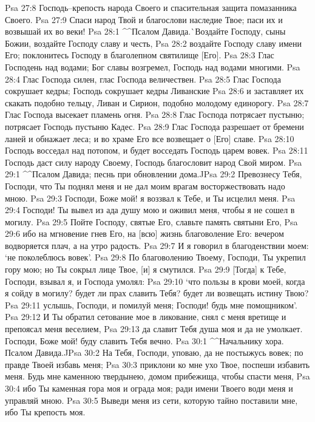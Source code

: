 Psa 27:8  Господь--крепость народа Своего и спасительная защита помазанника Своего.
Psa 27:9  Спаси народ Твой и благослови наследие Твое; паси их и возвышай их во веки!
Psa 28:1  ^^Псалом Давида.^^ Воздайте Господу, сыны Божии, воздайте Господу славу и честь,
Psa 28:2  воздайте Господу славу имени Его; поклонитесь Господу в благолепном святилище [Его].
Psa 28:3  Глас Господень над водами; Бог славы возгремел, Господь над водами многими.
Psa 28:4  Глас Господа силен, глас Господа величествен.
Psa 28:5  Глас Господа сокрушает кедры; Господь сокрушает кедры Ливанские
Psa 28:6  и заставляет их скакать подобно тельцу, Ливан и Сирион, подобно молодому единорогу.
Psa 28:7  Глас Господа высекает пламень огня.
Psa 28:8  Глас Господа потрясает пустыню; потрясает Господь пустыню Кадес.
Psa 28:9  Глас Господа разрешает от бремени ланей и обнажает леса; и во храме Его все возвещает о [Его] славе.
Psa 28:10  Господь восседал над потопом, и будет восседать Господь царем вовек.
Psa 28:11  Господь даст силу народу Своему, Господь благословит народ Свой миром.
Psa 29:1  ^^Псалом Давида; песнь при обновлении дома.^^
Psa 29:2  Превознесу Тебя, Господи, что Ты поднял меня и не дал моим врагам восторжествовать надо мною.
Psa 29:3  Господи, Боже мой! я воззвал к Тебе, и Ты исцелил меня.
Psa 29:4  Господи! Ты вывел из ада душу мою и оживил меня, чтобы я не сошел в могилу.
Psa 29:5  Пойте Господу, святые Его, славьте память святыни Его,
Psa 29:6  ибо на мгновение гнев Его, на [всю] жизнь благоволение Его: вечером водворяется плач, а на утро радость.
Psa 29:7  И я говорил в благоденствии моем: `не поколеблюсь вовек'.
Psa 29:8  По благоволению Твоему, Господи, Ты укрепил гору мою; но Ты сокрыл лице Твое, [и] я смутился.
Psa 29:9  [Тогда] к Тебе, Господи, взывал я, и Господа умолял:
Psa 29:10  `что пользы в крови моей, когда я сойду в могилу? будет ли прах славить Тебя? будет ли возвещать истину Твою?
Psa 29:11  услышь, Господи, и помилуй меня; Господи! будь мне помощником'.
Psa 29:12  И Ты обратил сетование мое в ликование, снял с меня вретище и препоясал меня веселием,
Psa 29:13  да славит Тебя душа моя и да не умолкает. Господи, Боже мой! буду славить Тебя вечно.
Psa 30:1  ^^Начальнику хора. Псалом Давида.^^
Psa 30:2  На Тебя, Господи, уповаю, да не постыжусь вовек; по правде Твоей избавь меня;
Psa 30:3  приклони ко мне ухо Твое, поспеши избавить меня. Будь мне каменною твердынею, домом прибежища, чтобы спасти меня,
Psa 30:4  ибо Ты каменная гора моя и ограда моя; ради имени Твоего води меня и управляй мною.
Psa 30:5  Выведи меня из сети, которую тайно поставили мне, ибо Ты крепость моя.
